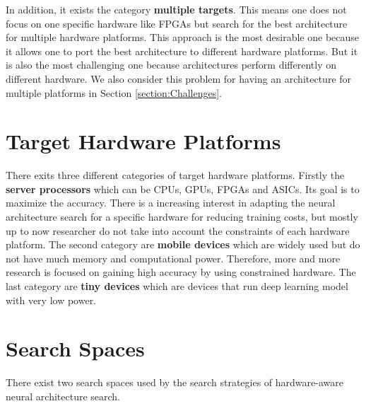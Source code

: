 \documentclass[conference]{IEEEtran}
\begin{document}
In addition, it exists the category \textbf{multiple targets}. This means one does not focus on one specific hardware like FPGAs but search for the best architecture for multiple hardware platforms. This approach is the most desirable one because it allows one to port the best architecture to different hardware platforms. But it is also the most challenging one because architectures perform differently on different hardware. We also consider this problem for having an architecture for multiple platforms in Section \ref{section:Challenges}.

\section{Target Hardware Platforms}
\label{section:HWPlatforms}
There exits three different categories of target hardware platforms. Firstly the \textbf{server processors} which can be CPUs, GPUs, FPGAs and ASICs. Its goal is to maximize the accuracy. There is a increasing interest in adapting the neural architecture search for a specific hardware for reducing training costs, but mostly up to now researcher do not take into account the constraints of each hardware platform. The second category are \textbf{mobile devices} which are widely used but do not have much memory and computational power. Therefore, more and more research is focused on gaining high accuracy by using constrained hardware. The last category are \textbf{tiny devices} which are devices that run deep learning model with very low power. 

\section{Search Spaces}
\label{section:SearchSpaces}
There exist two search spaces used by the search strategies of hardware-aware neural architecture search. 
\end{document}
